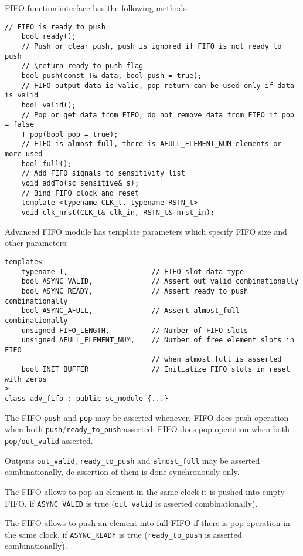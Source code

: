 FIFO function interface has the following methods:
%
\begin{lstlisting}[style=mycpp]
    // FIFO is ready to push
    bool ready();
    // Push or clear push, push is ignored if FIFO is not ready to push
    // \return ready to push flag
    bool push(const T& data, bool push = true);
    // FIFO output data is valid, pop return can be used only if data is valid
    bool valid();
    // Pop or get data from FIFO, do not remove data from FIFO if pop = false
    T pop(bool pop = true);
    // FIFO is almost full, there is AFULL_ELEMENT_NUM elements or more used
    bool full();
    // Add FIFO signals to sensitivity list
    void addTo(sc_sensitive& s);
    // Bind FIFO clock and reset
    template <typename CLK_t, typename RSTN_t>
    void clk_nrst(CLK_t& clk_in, RSTN_t& nrst_in);
\end{lstlisting}

Advanced FIFO module has template parameters which specify FIFO size and other parameters:  
%
\begin{lstlisting}[style=mycpp]
template<
    typename T,                    // FIFO slot data type 
    bool ASYNC_VALID,              // Assert out_valid combinationally
    bool ASYNC_READY,              // Assert ready_to_push combinationally
    bool ASYNC_AFULL,              // Assert almost_full combinationally
    unsigned FIFO_LENGTH,          // Number of FIFO slots
    unsigned AFULL_ELEMENT_NUM,    // Number of free element slots in FIFO
                                   // when almost_full is asserted
    bool INIT_BUFFER               // Initialize FIFO slots in reset with zeros
>
class adv_fifo : public sc_module {...}
\end{lstlisting}

The FIFO {\tt push} and {\tt pop} may be asserted whenever. FIFO does push operation when both {\tt push}/{\tt ready\_to\_push} asserted. FIFO does pop operation when both {\tt pop}/{\tt out\_valid} asserted.
 
Outputs {\tt out\_valid}, {\tt ready\_to\_push} and {\tt almost\_full} may be asserted combinationally, de-assertion of them is done synchronously only. 

The FIFO allows to pop an element in the same clock it is pushed into empty FIFO, if {\tt ASYNC\_VALID} is true ({\tt out\_valid} is asserted combinationally).

The FIFO allows to push an element into full FIFO if there is pop operation in the same clock, if {\tt ASYNC\_READY} is true ({\tt ready\_to\_push} is asserted combinationally).

